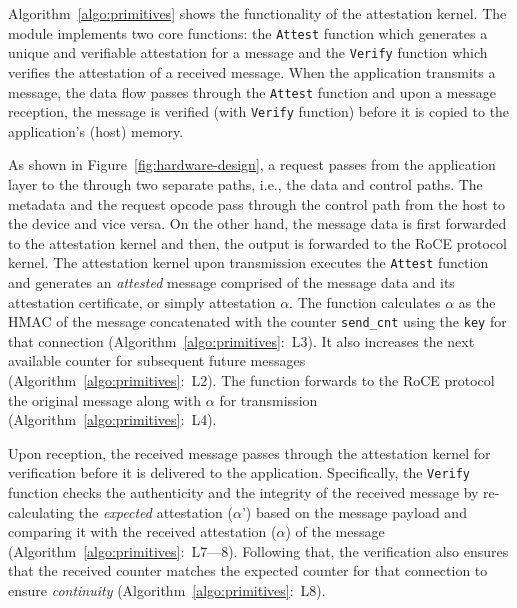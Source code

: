  Algorithm~\ref{algo:primitives} shows the functionality of the attestation kernel. The module implements two core functions: the {\tt Attest} function which generates a unique and verifiable attestation for a message and the {\tt Verify} function which verifies the attestation of a received message. When the application transmits a message, the data flow passes through the {\tt Attest} function and upon a message reception, the message is verified (with {\tt Verify} function) before it is copied to the application's (host) memory. 

As shown in Figure~\ref{fig:hardware-design}, a request passes from the application layer to the \projecttitle{} through two separate paths, i.e., the data and control paths. The metadata and the request opcode pass through the control path from the host to the device and vice versa. On the other hand, the message data is first forwarded to the attestation kernel and then, the output is forwarded to the RoCE protocol kernel. The attestation kernel upon transmission executes the \texttt{Attest} function and generates an {\em attested} message comprised of the message data and its attestation certificate, or simply attestation $\alpha$. The function calculates $\alpha$ as the HMAC of the message concatenated with the counter {\tt send\_cnt} using the {\tt key} for that connection (Algorithm~\ref{algo:primitives}:~L3). It also increases the next available counter for subsequent future messages (Algorithm~\ref{algo:primitives}:~L2). The function forwards to the RoCE protocol the original message along with $\alpha$ for transmission (Algorithm~\ref{algo:primitives}:~L4).


Upon reception, the received message passes through the attestation kernel for verification before it is delivered to the application. Specifically, the \texttt{Verify} function checks the authenticity and the integrity of the received message by re-calculating the {\em expected} attestation ($\alpha$') based on the message payload and comparing it with the received attestation ($\alpha$) of the message (Algorithm~\ref{algo:primitives}:~L7---8). Following that, the verification also ensures that the received counter matches the expected counter for that connection to ensure \emph{continuity} (Algorithm~\ref{algo:primitives}:~L8). 

